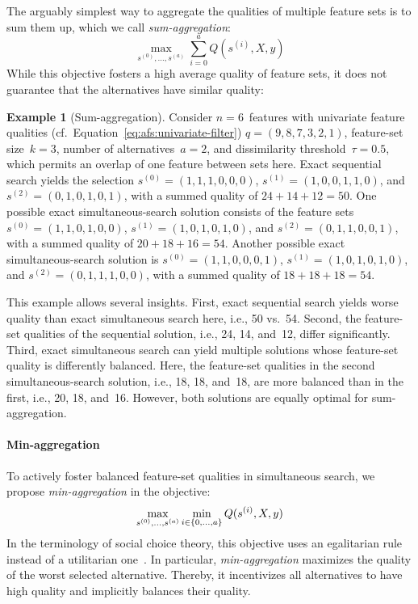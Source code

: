\documentclass{article}
\theoremstyle{definition}
\newtheorem{example}{Example}
\begin{document}
The arguably simplest way to aggregate the qualities of multiple feature sets is to sum them up, which we call \emph{sum-aggregation}:
%
\begin{equation}
	\max_{s^{(0)}, \dots, s^{(a)}} \sum_{i=0}^a Q(s^{(i)},X,y)
	\label{eq:afs:afs-simultaneous-sum-objective}
\end{equation}
%
While this objective fosters a high average quality of feature sets, it does not guarantee that the alternatives have similar quality:
%
\begin{example}[Sum-aggregation]
Consider $n=6$~features with univariate feature qualities (cf.~Equation~\ref{eq:afs:univariate-filter}) $q = (9,8,7,3,2,1)$, feature-set size~$k=3$, number of alternatives~$a=2$, and dissimilarity threshold~$\tau = 0.5$, which permits an overlap of one feature between sets here.
Exact sequential search yields the selection $s^{(0)} = (1,1,1,0,0,0)$, $s^{(1)} = (1,0,0,1,1,0)$, and $s^{(2)} = (0,1,0,1,0,1)$, with a summed quality of $24+14+12=50$.
One possible exact simultaneous-search solution consists of the feature sets $s^{(0)} = (1,1,0,1,0,0)$, $s^{(1)} = (1,0,1,0,1,0)$, and $s^{(2)} = (0,1,1,0,0,1)$, with a summed quality of $20+18+16=54$.
Another possible exact simultaneous-search solution is $s^{(0)} = (1,1,0,0,0,1)$, $s^{(1)} = (1,0,1,0,1,0)$, and $s^{(2)} = (0,1,1,1,0,0)$, with a summed quality of $18+18+18=54$.
\label{ex:afs:sum-aggregation}
\end{example}
%
This example allows several insights.
First, exact sequential search yields worse quality than exact simultaneous search here, i.e., 50 vs.~54.
Second, the feature-set qualities of the sequential solution, i.e., 24, 14, and~12, differ significantly.
Third, exact simultaneous search can yield multiple solutions whose feature-set quality is differently balanced.
Here, the feature-set qualities in the second simultaneous-search solution, i.e., 18, 18, and~18, are more balanced than in the first, i.e., 20, 18, and~16.
However, both solutions are equally optimal for sum-aggregation.

\paragraph{Min-aggregation}

To actively foster balanced feature-set qualities in simultaneous search, we propose \emph{min-aggregation} in the objective:
%
\begin{equation}
	\max_{s^{(0)}, \dots, s^{(a)}} \min_{i \in \{0, \dots, a\}} Q(s^{(i)},X,y) \\
	\label{eq:afs:afs-simultaneous-min-objective}
\end{equation}
%
In the terminology of social choice theory, this objective uses an egalitarian rule instead of a utilitarian one~\cite{myerson1981utilitarianism}.
In particular, \emph{min-aggregation} maximizes the quality of the worst selected alternative.
Thereby, it incentivizes all alternatives to have high quality and implicitly balances their quality.
\end{document}

